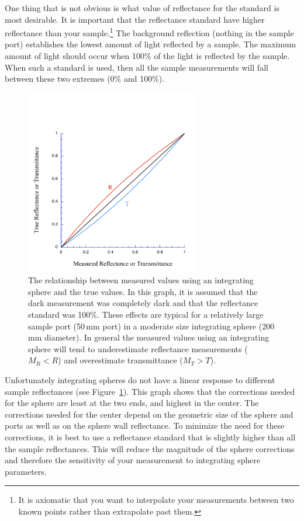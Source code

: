 \documentclass{article}
\begin{document}
One thing that is not obvious is what value of reflectance for the standard
is most desirable.  It is important that the reflectance standard have higher
reflectance than your sample.\footnote{It is axiomatic that you want
to interpolate your measurements between two known points rather than
extrapolate past them.}  The background reflection (nothing in the sample port)
establishes the lowest amount of light reflected by a sample.  The maximum
amount of light should occur when 100\% of the light is reflected by the sample.
When such a standard is used, then all the sample measurements
will fall between these two extremes (0\% and 100\%).  

\begin{figure}[!t]
\centering
\includegraphics[width=3in]{ch3RTcorr.pdf}
\caption{The relationship between measured values using an integrating sphere
and the true values.  In this
graph, it is assumed that the dark measurement was completely dark and that
the reflectance standard was 100\%.  These effects are typical for a relatively
large sample port (50\,mm port) in a moderate size integrating sphere (200\,mm diameter).
In general the measured values using an integrating sphere will tend to underestimate reflectance measurements ($M_R<R$)
and overestimate transmittance ($M_T>T$).}
\label{spherecorr}
\end{figure}

Unfortunately integrating spheres do not
have a linear response to different sample reflectances (see Figure~\ref{spherecorr}).
This graph shows that the corrections needed for the sphere are least at
the two ends, and highest in the center.  The corrections needed for the
center depend on the geometric size of the sphere and ports as well as
on the sphere wall reflectance.  To minimize the need for these corrections,
it is best to use a reflectance standard that is slightly higher than all
the sample reflectances.  This will reduce the magnitude of the sphere 
corrections and therefore the sensitivity of your measurement to integrating
sphere parameters.
\end{document}
